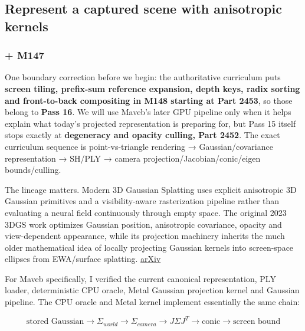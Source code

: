 \subsection{Represent a captured scene with anisotropic kernels}\label{04-visual-computing-ii-ch037-represent-a-captured-scene-with-anisotropic-kernels}

\hypertarget{04-visual-computing-ii-ch037-represent-a-captured-scene-with-anisotropic-kernels}{}

\subsubsection{+ M147}\label{04-visual-computing-ii-ch037-m147}

\hypertarget{04-visual-computing-ii-ch037-m147}{}

One boundary correction before we begin: the authoritative curriculum puts \textbf{screen tiling, prefix-sum reference expansion, depth keys, radix sorting and front-to-back compositing in M148 starting at Part 2453}, so those belong to \textbf{Pass 16}. We will use Maveb's later GPU pipeline only when it helps explain what today's projected representation is preparing for, but Pass 15 itself stops exactly at \textbf{degeneracy and opacity culling, Part 2452}. The exact curriculum sequence is point-vs-triangle rendering → Gaussian/covariance representation → SH/PLY → camera projection/Jacobian/conic/eigen bounds/culling.

The lineage matters. Modern 3D Gaussian Splatting uses explicit anisotropic 3D Gaussian primitives and a visibility-aware rasterization pipeline rather than evaluating a neural field continuously through empty space. The original 2023 3DGS work optimizes Gaussian position, anisotropic covariance, opacity and view-dependent appearance, while its projection machinery inherits the much older mathematical idea of locally projecting Gaussian kernels into screen-space ellipses from EWA/surface splatting. \href{https://arxiv.org/abs/2308.04079?utm_source=chatgpt.com}{arXiv}

For Maveb specifically, I verified the current canonical representation, PLY loader, deterministic CPU oracle, Metal Gaussian projection kernel and Gaussian pipeline. The CPU oracle and Metal kernel implement essentially the same chain:

\[
\boxed{
\text{stored Gaussian}
\rightarrow
\Sigma_{world}
\rightarrow
\Sigma_{camera}
\rightarrow
J\Sigma J^T
\rightarrow
\text{conic}
\rightarrow
\text{screen bound}
}
\]

